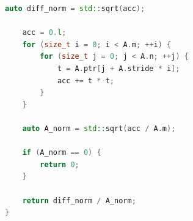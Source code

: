 \documentclass[11pt, a4paper]{article}
\begin{document}
\begin{lstlisting}[language=C++, frame=single]
    auto diff_norm = std::sqrt(acc);

    acc = 0.l;
    for (size_t i = 0; i < A.m; ++i) {
        for (size_t j = 0; j < A.n; ++j) {
            t = A.ptr[j + A.stride * i];
            acc += t * t;
        }
    }

    auto A_norm = std::sqrt(acc / A.m);

    if (A_norm == 0) {
        return 0;
    }

    return diff_norm / A_norm;
}
\end{lstlisting}
\end{document}

